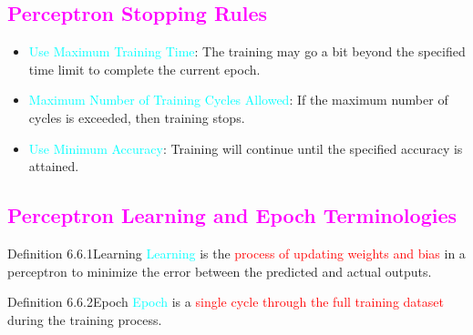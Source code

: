 \documentclass{book}
\begin{document}
\textcolor{magenta}{\section{\textbf{Perceptron Stopping Rules}}}
\begin{itemize}
    \item \textcolor{cyan}{Use Maximum Training Time}: The training may go a bit beyond the specified time limit to complete the current epoch.
    \item \textcolor{cyan}{Maximum Number of Training Cycles Allowed}: If the maximum number of cycles is exceeded, then training stops.
    \item \textcolor{cyan}{Use Minimum Accuracy}: Training will continue until the specified accuracy is attained.
\end{itemize}
\textcolor{magenta}{\section{\textbf{Perceptron Learning and Epoch Terminologies}}}
\begin{defBox}{Definition 6.6.1}{Learning}
    \textcolor{cyan}{Learning} is the \textcolor{red}{process of updating weights and bias} in a perceptron to minimize the error between the predicted and actual outputs.
\end{defBox}
\begin{defBox}{Definition 6.6.2}{Epoch}
    \textcolor{cyan}{Epoch} is a \textcolor{red}{single cycle through the full training dataset} during the training process.
\end{defBox}
\newpage
\end{document}
